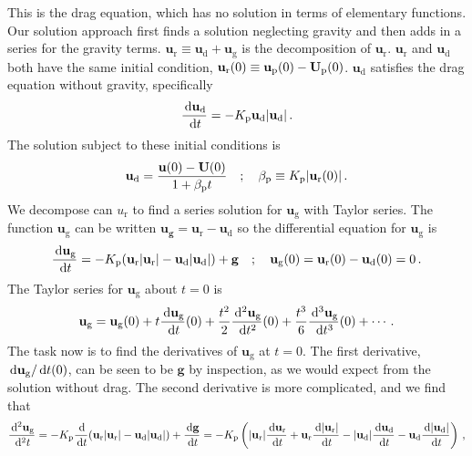 This is the drag equation, which has no solution in terms of elementary functions. Our solution approach first finds a solution neglecting gravity and then adds in a series for the gravity terms. $\mathbf{u}_\text{r} \equiv \mathbf{u}_\text{d} + \mathbf{u}_\text{g}$ is the decomposition of $\mathbf{u}_\text{r}$. $\mathbf{u}_\text{r}$ and $\mathbf{u}_\text{d}$ both have the same initial condition, $\mathbf{u}_\text{r}(0) \equiv \mathbf{u}_{\rm p}(0) - \mathbf{U}_{\rm p}(0)$. $\mathbf{u}_\text{d}$ satisfies the drag equation without gravity, specifically
\begin{align}
    \frac{\,\mathrm{d} \mathbf{u}_\text{d}}{\,\mathrm{d} t} = -K_{\rm p} \mathbf{u}_\text{d} |\mathbf{u}_\text{d}| \,.
\end{align}
The solution subject to these initial conditions is
\begin{align}
    \label{ud_exact}
    \mathbf{u}_\text{d} = \frac{\mathbf{u}(0) - \mathbf{U}(0)}{1 + \beta_{\rm p} t} \quad ; \quad \beta_{\rm p} \equiv K_{\rm p} |\mathbf{u}_{\text{r}}(0)| \,.
\end{align}
We decompose can $u_\text{r}$ to find a series solution for $\mathbf{u}_\text{g}$ with Taylor series. The function $\mathbf{u}_\text{g}$ can be written $\mathbf{u_g} = \mathbf{u}_\text{r} - \mathbf{u}_\text{d}$ so the differential equation for $\mathbf{u}_\text{g}$ is
\begin{align}
    \frac{\,\mathrm{d} \mathbf{u}_\text{g}}{\,\mathrm{d} t} = -K_{\rm p} (\mathbf{u}_\text{r} |\mathbf{u}_\text{r}| - \mathbf{u}_\text{d} |\mathbf{u}_\text{d}|) + \mathbf{g} \quad ; \quad \mathbf{u}_\text{g}(0) = \mathbf{u}_\text{r}(0) - \mathbf{u}_\text{d}(0) = 0 \,.
\end{align}
The Taylor series for $\mathbf{u}_\text{g}$ about $t = 0$ is
\begin{align}
    \mathbf{u}_\text{g} = \mathbf{u}_\text{g}(0) + t \frac{\,\mathrm{d} \mathbf{u}_\text{g}}{\,\mathrm{d} t}(0) + \frac{t^2}{2} \frac{\,\mathrm{d}^2 \mathbf{u}_\text{g}}{\,\mathrm{d} t^2}(0) + \frac{t^3}{6} \frac{\,\mathrm{d}^3 \mathbf{u}_\text{g}}{\,\mathrm{d} t^3}(0) + \cdots \,.
\end{align}
The task now is to find the derivatives of $\mathbf{u}_\text{g}$ at $t = 0$. The first derivative, $\,\mathrm{d} \mathbf{u}_\text{g} / \,\mathrm{d} t(0)$, can be seen to be $\mathbf{g}$ by inspection, as we would expect from the solution without drag. The second derivative is more complicated, and we find that
\begin{align*}
    \frac{\,\mathrm{d}^2 \mathbf{u}_\text{g}}{\,\mathrm{d}^2 t} = -K_{\rm p} \frac{\,\mathrm{d}}{\,\mathrm{d} t}(\mathbf{u}_\text{r} |\mathbf{u}_\text{r}| - \mathbf{u}_\text{d} |\mathbf{u}_\text{d}|) + \frac{\,\mathrm{d} \mathbf{g}}{\,\mathrm{d} t} = -K_{\rm p} \left(|\mathbf{u}_\text{r}| \frac{\,\mathrm{d} \mathbf{u}_\text{r}}{\,\mathrm{d} t} + \mathbf{u}_\text{r} \frac{\,\mathrm{d} |\mathbf{u}_\text{r}|}{\,\mathrm{d} t} - |\mathbf{u}_\text{d}| \frac{\,\mathrm{d} \mathbf{u}_\text{d}}{\,\mathrm{d} t} - \mathbf{u}_\text{d} \frac{\,\mathrm{d} |\mathbf{u}_\text{d}|}{\,\mathrm{d} t}\right) \,,
\end{align*}
